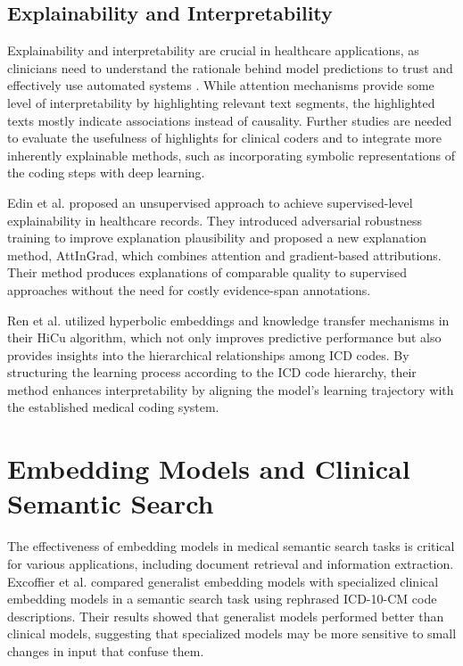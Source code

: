 \documentclass[12pt,a4paper]{report}
\begin{document}
\subsection{Explainability and Interpretability}

Explainability and interpretability are crucial in healthcare applications, as clinicians need to understand the rationale behind model predictions to trust and effectively use automated systems \cite{holzinger2017we}. While attention mechanisms provide some level of interpretability by highlighting relevant text segments, the highlighted texts mostly indicate associations instead of causality. Further studies are needed to evaluate the usefulness of highlights for clinical coders and to integrate more inherently explainable methods, such as incorporating symbolic representations of the coding steps with deep learning.

Edin et al. \cite{edin2024unsupervised} proposed an unsupervised approach to achieve supervised-level explainability in healthcare records. They introduced adversarial robustness training to improve explanation plausibility and proposed a new explanation method, AttInGrad, which combines attention and gradient-based attributions. Their method produces explanations of comparable quality to supervised approaches without the need for costly evidence-span annotations.

Ren et al. \cite{ren2022hicu} utilized hyperbolic embeddings and knowledge transfer mechanisms in their HiCu algorithm, which not only improves predictive performance but also provides insights into the hierarchical relationships among ICD codes. By structuring the learning process according to the ICD code hierarchy, their method enhances interpretability by aligning the model's learning trajectory with the established medical coding system.

\section{Embedding Models and Clinical Semantic Search}

The effectiveness of embedding models in medical semantic search tasks is critical for various applications, including document retrieval and information extraction. Excoffier et al. \cite{excoffier2024generalist} compared generalist embedding models with specialized clinical embedding models in a semantic search task using rephrased ICD-10-CM code descriptions. Their results showed that generalist models performed better than clinical models, suggesting that specialized models may be more sensitive to small changes in input that confuse them.
\end{document}
